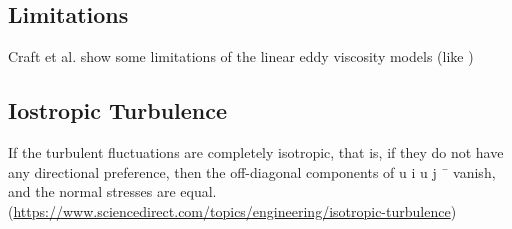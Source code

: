 \subsection{Limitations}

Craft et al. \cite{craft1996development} show some limitations of the linear eddy viscosity models (like \keModel)


\subsection{Iostropic Turbulence}

If the turbulent fluctuations are completely isotropic, that is, if they do not have any directional preference, then the off-diagonal components of u i u j ¯ vanish, and the normal stresses are equal.
(\url{https://www.sciencedirect.com/topics/engineering/isotropic-turbulence})
